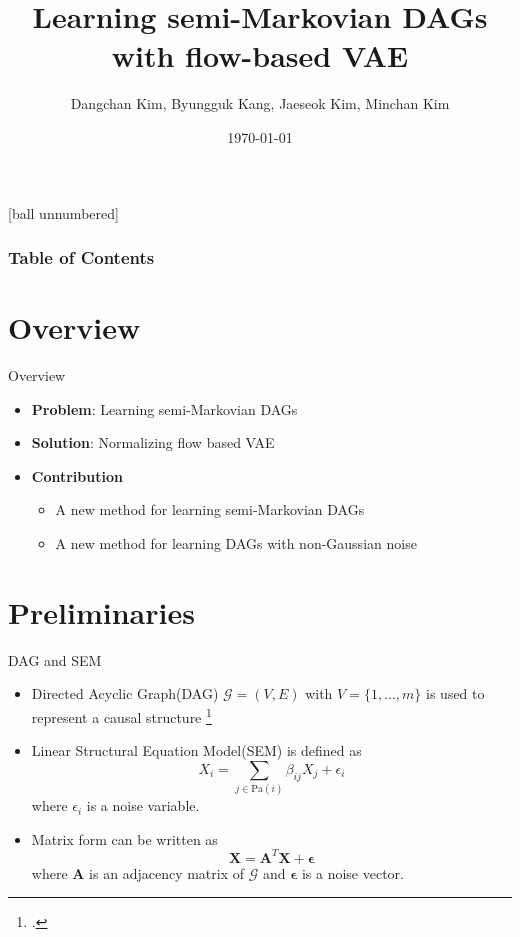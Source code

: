 \documentclass{beamer}
\title[NFG-VAE]{Learning semi-Markovian DAGs with flow-based VAE}
\author[Seoul National University]{Dangchan Kim, Byungguk Kang, Jaeseok Kim, Minchan Kim}
\institute[]{Seoul National University}
\date{\today}
\begin{document}
\frame{\titlepage}

[ball unnumbered]
\begin{frame}
    \frametitle{Table of Contents}
    \tableofcontents
\end{frame}


\section*{Overview}

\begin{frame}{Overview}
    \begin{itemize}
        \item \textbf{Problem}: Learning semi-Markovian DAGs
        \item \textbf{Solution}: Normalizing flow based VAE
        \item \textbf{Contribution}
        \begin{itemize}
            \item A new method for learning semi-Markovian DAGs
            \item A new method for learning DAGs with non-Gaussian noise
        \end{itemize}
    \end{itemize}
\end{frame}

\section{Preliminaries}

\begin{frame}{DAG and SEM}
    \begin{itemize}
        \item Directed Acyclic Graph(DAG) $\mathcal G = (V, E)$ with $V = \{1, \dots, m\}$ is used to represent a causal structure \footcite{pearl_2009}
        \item Linear Structural Equation Model(SEM) is defined as
        \begin{equation*}
            X_i = \sum_{j \in \text{Pa}(i)} \beta_{ij} X_j + \epsilon_i
        \end{equation*}
        where $\epsilon_i$ is a noise variable.
        \item Matrix form can be written as
        \begin{equation}
            \mathbf X = \mathbf A^T \mathbf X + \mathbf \epsilon
        \end{equation}
        where $\mathbf A$ is an adjacency matrix of $\mathcal G$ and $\mathbf \epsilon$ is a noise vector.
    \end{itemize}
\end{frame}
\end{document}
